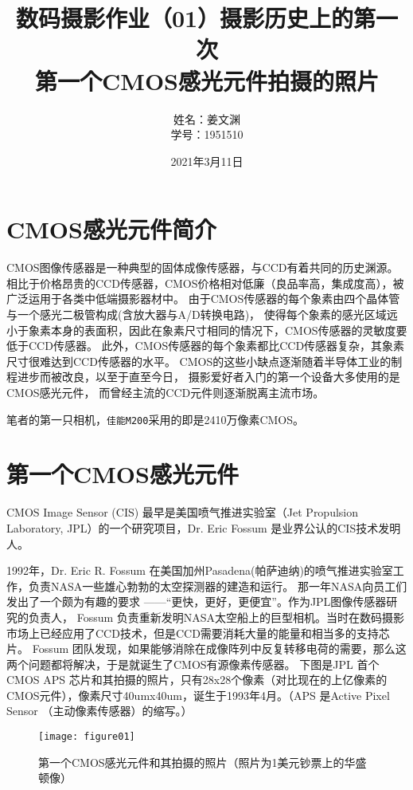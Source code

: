 \documentclass[cn,black,9pt,normal]{elegantnote}
\title{数码摄影作业（01）摄影历史上的第一次\\\small{第一个CMOS感光元件拍摄的照片}}
\author{姓名：姜文渊\\学号：1951510}
\date{2021年3月11日}
\newcommand{\upcite}[1]{\textsuperscript{\textsuperscript{\cite{#1}}}}
\begin{document}
\maketitle


\section{CMOS感光元件简介}

CMOS图像传感器是一种典型的固体成像传感器，与CCD有着共同的历史渊源。
相比于价格昂贵的CCD传感器，CMOS价格相对低廉（良品率高，集成度高），被广泛运用于各类中低端摄影器材中。
由于CMOS传感器的每个象素由四个晶体管与一个感光二极管构成(含放大器与A/D转换电路)，
使得每个象素的感光区域远小于象素本身的表面积，因此在象素尺寸相同的情况下，CMOS传感器的灵敏度要低于CCD传感器。
此外，CMOS传感器的每个象素都比CCD传感器复杂，其象素尺寸很难达到CCD传感器的水平。
CMOS的这些小缺点逐渐随着半导体工业的制程进步而被改良，以至于直至今日，
摄影爱好者入门的第一个设备大多使用的是CMOS感光元件，
而曾经主流的CCD元件则逐渐脱离主流市场。\upcite{fossum1993active}

笔者的第一只相机，\texttt{佳能M200}采用的即是2410万像素CMOS。

\section{第一个CMOS感光元件}

CMOS Image Sensor (CIS) 最早是美国喷气推进实验室（Jet Propulsion Laboratory, JPL）的一个研究项目，Dr. Eric Fossum 是业界公认的CIS技术发明人。

1992年，Dr. Eric R. Fossum 在美国加州Pasadena(帕萨迪纳)的喷气推进实验室工作，负责NASA一些雄心勃勃的太空探测器的建造和运行。
那一年NASA向员工们发出了一个颇为有趣的要求 ——“更快，更好，更便宜”。作为JPL图像传感器研究的负责人，
Fossum 负责重新发明NASA太空船上的巨型相机。当时在数码摄影市场上已经应用了CCD技术，但是CCD需要消耗大量的能量和相当多的支持芯片。
Fossum 团队发现，如果能够消除在成像阵列中反复转移电荷的需要，那么这两个问题都将解决，于是就诞生了CMOS有源像素传感器。\upcite{LL2020}
下图是JPL 首个CMOS APS 芯片和其拍摄的照片，只有28x28个像素（对比现在的上亿像素的CMOS元件），像素尺寸40umx40um，诞生于1993年4月。\upcite{fossum2020invention}（APS 是Active Pixel Sensor （主动像素传感器）的缩写。）
\begin{figure}[h]
    \centering
    \texttt{[image: figure01]}
    \caption{第一个CMOS感光元件和其拍摄的照片（照片为1美元钞票上的华盛顿像）}
    \label{F-01}
\end{figure}

{}
\end{document}
